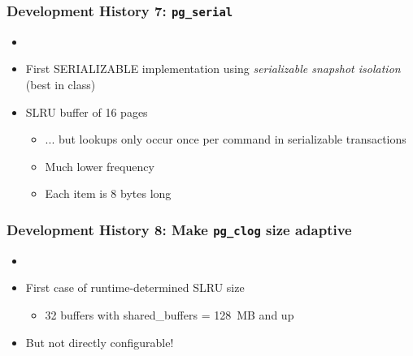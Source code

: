 \begin{frame}
  \frametitle{Development History 7: \texttt{pg\_serial}}
   \begin{itemize}
     \item {}
     \item First SERIALIZABLE implementation using \emph{serializable snapshot isolation} (best in class)
     \item SLRU buffer of 16 pages
       \begin{itemize}
	 \item ... but lookups only occur once per command in serializable transactions
	 \item Much lower frequency
	 \item Each item is 8 bytes long
       \end{itemize}
   \end{itemize}
\end{frame}

\begin{frame}
  \frametitle{Development History 8: Make \texttt{pg\_clog} size adaptive}
  \begin{itemize}
     \item {}
     \item First case of runtime-determined SLRU size
     \begin{itemize}
       \item 32 buffers with shared\_buffers = 128~MB and up
     \end{itemize}
   \item But not directly configurable!
  \end{itemize}
\end{frame}

